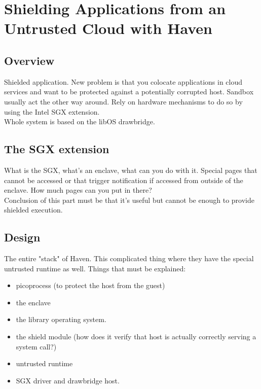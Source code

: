 \section{Shielding Applications from an Untrusted Cloud with Haven}

\subsection{Overview}

Shielded application.
New problem is that you colocate applications in cloud services and want to be protected against a potentially corrupted host.
Sandbox usually act the other way around.
Rely on hardware mechanisms to do so by using the Intel SGX extension.\\

Whole system is based on the libOS drawbridge.\\

\subsection{The SGX extension}
What is the SGX, what's an enclave, what can you do with it.
Special pages that cannot be accessed or that trigger notification if accessed from outside of the enclave.
How much pages can you put in there?\\

Conclusion of this part must be that it's useful but cannot be enough to provide shielded execution.

\subsection{Design}
The entire "stack" of Haven.
This complicated thing where they have the special untrusted runtime as well.
Things that must be explained:
\begin{itemize}
	\item picoprocess (to protect the host from the guest)
	\item the enclave
	\item the library operating system.
	\item the shield module (how does it verify that host is actually correctly serving a system call?)
	\item untrusted runtime
	\item SGX driver and drawbridge host.
\end{itemize}

